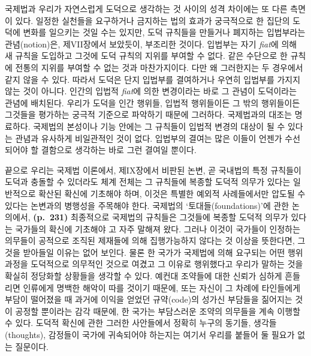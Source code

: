 국제법과 우리가 자연스럽게 도덕으로 생각하는 것 사이의 성격 차이에는 또
다른 측면이 있다. 일정한 실천들을 요구하거나 금지하는 법의 효과가
궁극적으로 한 집단의 도덕에 변화를 일으키는 것일 수는 있지만, 도덕
규칙들을 만들거나 폐지하는 입법부라는 관념(notion)은, 제VII장에서
보았듯이, 부조리한 것이다. 입법부는 자기 \emph{fiat}에 의해 새 규칙을
도입하고 그것에 도덕 규칙의 지위를 부여할 수 없다. 같은 수단으로 한
규칙에 전통의 지위를 부여할 수 없는 것과 마찬가지이다. 다만 왜
그러한지는 두 경우에서 같지 않을 수 있다. 따라서 도덕은 단지 입법부를
결여하거나 우연히 입법부를 가지지 않는 것이 아니다. 인간의 입법적
\emph{fiat}에 의한 변경이라는 바로 그 관념이 도덕이라는 관념에 배치된다.
우리가 도덕을 인간 행위들, 입법적 행위들이든 그 밖의 행위들이든 그것들을
평가하는 궁극적 기준으로 파악하기 때문에 그러하다. 국제법과의 대조는
명료하다. 국제법의 본성이나 기능 안에는 그 규칙들이 입법적 변경의 대상이
될 수 있다는 관념과 유사하게 비일관적인 것이 없다. 입법부의 결여는 많은
이들이 언젠가 수선되어야 할 결함으로 생각하는 바로 그런 결여일 뿐이다.

끝으로 우리는 국제법 이론에서, 제IX장에서 비판된 논변, 곧 국내법의 특정
규칙들이 도덕과 충돌할 수 있더라도 체계 전체는 그 규칙들에 복종할 도덕적
의무가 있다는 일반적으로 확산된 확신에 기초해야 하며, 이것은 특별한
예외적 사례들에서만 압도될 수 있다는 논변과의 병행성을 주목해야 한다.
국제법의 ‘토대들(foundations)’에 관한 논의에서, \textbf{(p.~231)}
최종적으로 국제법의 규칙들은 그것들에 복종할 도덕적 의무가 있다는
국가들의 확신에 기초해야 고 자주 말해져 왔다. 그러나 이것이
국가들이 인정하는 의무들이 공적으로 조직된 제재들에 의해 집행가능하지
않다는 것 이상을 뜻한다면, 그것을 받아들일 이유는 없어 보인다. 물론 한
국가가 국제법에 의해 요구되는 어떤 행위 과정을 도덕적으로 의무적인
것으로 여겼고 그 이유로 행위했다고 우리가 말하는 것을 확실히 정당화할
상황들을 생각할 수 있다. 예컨대 조약들에 대한 신뢰가 심하게 흔들리면
인류에게 명백한 해악이 따를 것이기 때문에, 또는 자신이 그 차례에
타인들에게 부담이 떨어졌을 때 과거에 이익을 얻었던 규약(code)의 성가신
부담들을 짊어지는 것이 공정할 뿐이라는 감각 때문에, 한 국가는 부담스러운
조약의 의무들을 계속 이행할 수 있다. 도덕적 확신에 관한 그러한
사안들에서 정확히 누구의 동기들, 생각들(thoughts), 감정들이 국가에
귀속되어야 하는지는 여기서 우리를 붙들어 둘 필요가 없는 질문이다.

